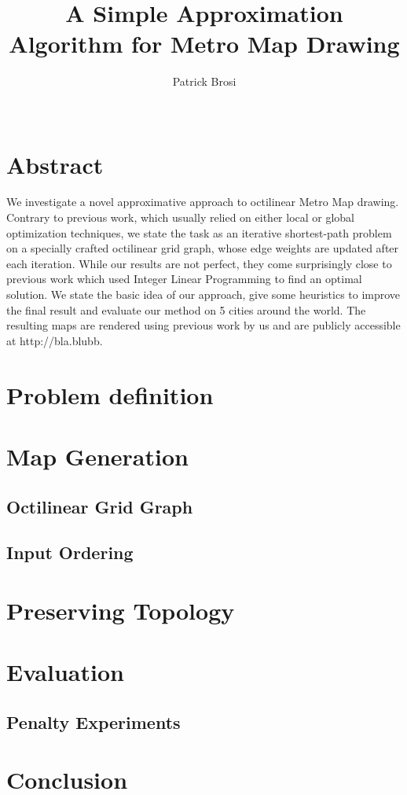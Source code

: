 \documentclass{sig-alternate-sigmod09}
\begin{document}
\title{A Simple Approximation Algorithm for Metro Map Drawing}

\author{Patrick Brosi\\\\}

\maketitle

\section{Abstract}

We investigate a novel approximative approach to octilinear Metro Map drawing. Contrary to previous work, which usually relied on either local or global optimization techniques, we state the task as an iterative shortest-path problem on a specially crafted octilinear grid graph, whose edge weights are updated after each iteration. While our results are not perfect, they come surprisingly close to previous work which used Integer Linear Programming to find an optimal solution. We state the basic idea of our approach, give some heuristics to improve the final result and evaluate our method on 5 cities around the world. The resulting maps are rendered using previous work by us and are publicly accessible at http://bla.blubb. 

\section{Problem definition}

\section{Map Generation}

\subsection{Octilinear Grid Graph}

\subsection{Input Ordering}

\section{Preserving Topology}

\section{Evaluation}

\subsection{Penalty Experiments}

\section{Conclusion}

\balancecolumns
\end{document}
